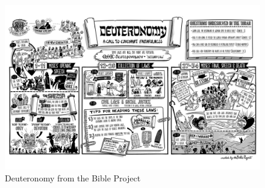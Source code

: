 

\newpage
\begin{figure}
\begin{center}
\includegraphics[scale=0.5, angle=90]{05OT-Deuteronomy/References/BibleProject-Deuteronomy.jpg}
\caption[Deuteronomy from the Bible Project]{Deuteronomy from the Bible Project}
\label{fig:Deuteronomy from the Bible Project}
\end{center}
\end{figure}


